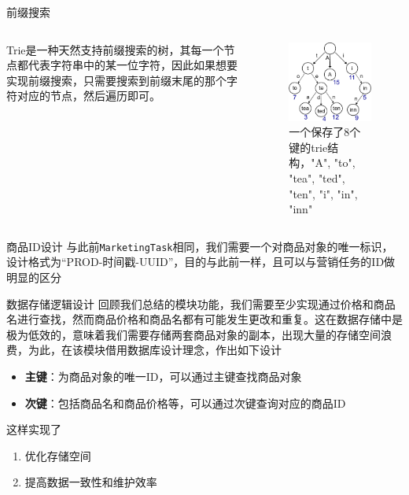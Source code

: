 \documentclass[aspectratio=169]{beamer}
\begin{document}
\begin{frame}{前缀搜索}
    \begin{columns}
        \begin{column}{0.6\textwidth}
            Trie是一种天然支持前缀搜索的树，其每一个节点都代表字符串中的某一位字符，因此如果想要实现前缀搜索，只需要搜索到前缀末尾的那个字符对应的节点，然后遍历即可。
        \end{column}
        \begin{column}{0.4\textwidth}
            \begin{figure}[t]
                \begin{center}
                \centerline{\includegraphics[width=0.6\columnwidth]{resources/Trie_example-crop.pdf}}
                \caption{一个保存了8个键的trie结构，"A", "to", "tea", "ted", "ten", "i", "in", "inn"}
                \label{fig: trie example}
                \end{center}
            \end{figure}
        \end{column}
    \end{columns}
\end{frame}

\begin{frame}{商品ID设计}
    与此前\texttt{MarketingTask}相同，我们需要一个对商品对象的唯一标识，设计格式为“PROD-时间戳-UUID”，目的与此前一样，且可以与营销任务的ID做明显的区分
\end{frame}

\begin{frame}{数据存储逻辑设计}
    回顾我们总结的模块功能，我们需要至少实现通过价格和商品名进行查找，然而商品价格和商品名都有可能发生更改和重复。这在数据存储中是极为低效的，意味着我们需要存储两套商品对象的副本，出现大量的存储空间浪费，为此，在该模块借用数据库设计理念，作出如下设计
    \begin{itemize}
        \item \textbf{主键}：为商品对象的唯一ID，可以通过主键查找商品对象
        \item \textbf{次键}：包括商品名和商品价格等，可以通过次键查询对应的商品ID
    \end{itemize}
    这样实现了
    \begin{enumerate}
        \item 优化存储空间
        \item 提高数据一致性和维护效率
    \end{enumerate}
\end{frame}
\end{document}
